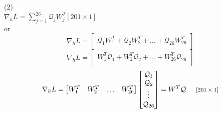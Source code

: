 \documentclass{report}
\newcommand{\tab}{\-\hspace{0.5cm}}
\begin{document}
(2)\\
\tab$\nabla_{h} L = \sum_{j=1}^{26}{\mathcal{Q}_j W_j^T}$\tab\footnotesize$[201\times1]$\normalsize\\
\tab or
$$ \nabla_{h} L = \begin{bmatrix}
\mathcal{Q}_1 W_1^T + \mathcal{Q}_2 W_2^T + ... + \mathcal{Q}_{26} W_{26}^T\\
\end{bmatrix} $$
$$ \nabla_{h} L = \begin{bmatrix}
W_1^T \mathcal{Q}_1 + W_2^T \mathcal{Q}_2 + ... + W_{26}^T \mathcal{Q}_{26}\\
\end{bmatrix} $$
$$ \nabla_{h} L = \begin{bmatrix}
W_1^T & W_2^T & \hdots & W_{26}^T \\
\end{bmatrix}\begin{bmatrix}
\mathcal{Q}_1 \\
\mathcal{Q}_2 \\
\vdots \\
\mathcal{Q}_{26} \\
\end{bmatrix} = W^T \mathcal{Q} \text{\tab\footnotesize$[201\times1]$\normalsize} $$
\end{document}
